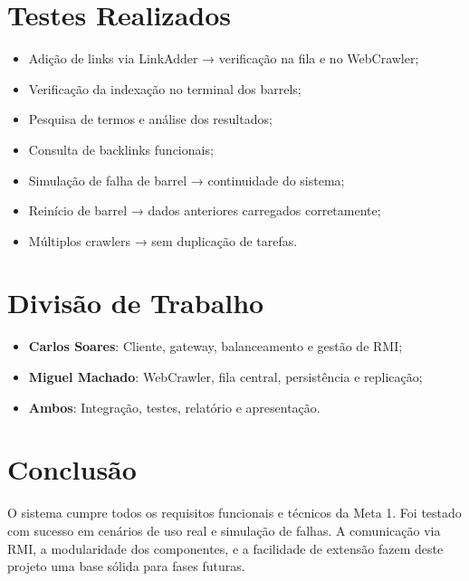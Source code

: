 \documentclass{article}
\begin{document}
\newpage

\section{Testes Realizados}
\begin{itemize}
    \item Adição de links via LinkAdder → verificação na fila e no WebCrawler;
    \item Verificação da indexação no terminal dos barrels;
    \item Pesquisa de termos e análise dos resultados;
    \item Consulta de backlinks funcionais;
    \item Simulação de falha de barrel → continuidade do sistema;
    \item Reinício de barrel → dados anteriores carregados corretamente;
    \item Múltiplos crawlers → sem duplicação de tarefas.
\end{itemize}

\newpage

\section{Divisão de Trabalho}
\begin{itemize}
    \item \textbf{Carlos Soares}: Cliente, gateway, balanceamento e gestão de RMI;
    \item \textbf{Miguel Machado}: WebCrawler, fila central, persistência e replicação;
    \item \textbf{Ambos}: Integração, testes, relatório e apresentação.
\end{itemize}

\newpage

\section{Conclusão}
O sistema cumpre todos os requisitos funcionais e técnicos da Meta 1. Foi testado com sucesso em cenários de uso real e simulação de falhas. A comunicação via RMI, a modularidade dos componentes, e a facilidade de extensão fazem deste projeto uma base sólida para fases futuras.


\maketitle
\end{document}
